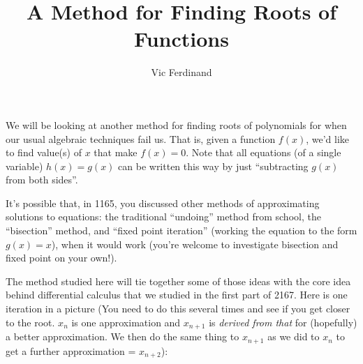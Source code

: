 \documentclass{ximera}
\author{Vic Ferdinand}
\title{A Method for Finding Roots of Functions}
\begin{document}
\begin{abstract}
\end{abstract}
\maketitle

We will be looking at another method for finding roots of polynomials for when our usual algebraic techniques fail us.  That is, given a function $f(x)$, we'd like to find value(s) of $x$ that make $f(x) = 0$.  Note that all equations (of a single variable) $h(x) = g(x)$ can be written this way by just ``subtracting $g(x)$ from both sides''.

It's possible that, in 1165, you discussed other methods of approximating solutions to equations:  the traditional ``undoing'' method from school, the ``bisection'' method, and ``fixed point iteration'' (working the equation to the form $g(x) = x$), when it would work (you're welcome to investigate bisection and fixed point on your own!).

The method studied here will tie together some of those ideas with the core idea behind differential calculus that we studied in the first part of 2167.  Here is one iteration in a picture (You need to do this several times and see if you get closer to the root. $x_n$ is one approximation and $x_{n+1}$ is {\em derived from that} for (hopefully) a better approximation.  We then do the same thing to $x_{n+1}$  as we did to $x_n$ to get a further approximation = $x_{n+2}$):


\begin{center}
\end{center}
\end{document}
